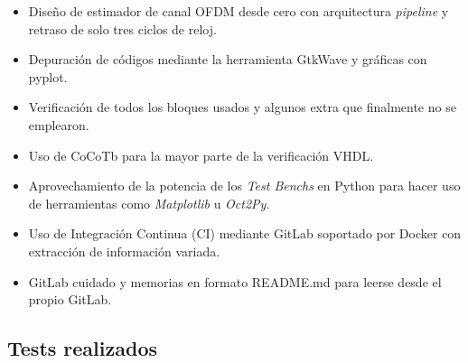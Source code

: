 \documentclass[11pt]{scrartcl} %
\begin{document}
\begin{preview}
\begin{itemize}
	\item Diseño de estimador de canal OFDM desde cero con arquitectura \emph{pipeline} y retraso de solo tres ciclos de reloj.
	\item Depuración de códigos mediante la herramienta GtkWave y gráficas con pyplot.
	\item Verificación de todos los bloques usados y algunos extra que finalmente no se emplearon.
	\item Uso de CoCoTb para la mayor parte de la verificación VHDL.
	\item Aprovechamiento de la potencia de los \emph{Test Benchs} en Python para hacer uso de herramientas como \emph{Matplotlib} u \emph{Oct2Py}.
	\item Uso de Integración Continua (CI) mediante GitLab soportado por Docker con extracción de información variada.
	\item GitLab cuidado y memorias en formato README.md para leerse desde el propio GitLab.
\end{itemize}

\subsection{Tests realizados}


\end{preview}
\end{document}
